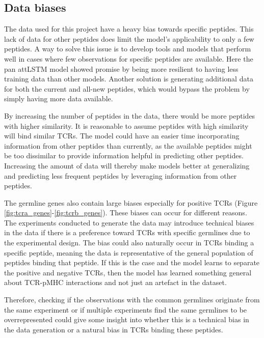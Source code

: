\subsection{Data biases}
The data used for this project have a heavy bias towards specific peptides. This lack of data for other peptides does limit the model's applicability to only a few peptides. A way to solve this issue is to develop tools and models that perform well in cases where few observations for specific peptides are available. Here the pan attLSTM model showed promise by being more resilient to having less training data than other models. Another solution is generating additional data for both the current and all-new peptides, which would bypass the problem by simply having more data available. 

By increasing the number of peptides in the data, there would be more peptides with higher similarity. It is reasonable to assume peptides with high similarity will bind similar TCRs. The model could have an easier time incorporating information from other peptides than currently, as the available peptides might be too dissimilar to provide information helpful in predicting other peptides. Increasing the amount of data will thereby make models better at generalizing and predicting less frequent peptides by leveraging information from other peptides.

The germline genes also contain large biases especially for positive TCRs (Figure \ref{fig:tcra_genes}-\ref{fig:tcrb_genes}). These biases can occur for different reasons. The experiments conducted to generate the data may introduce technical biases in the data if there is a preference toward TCRs with specific germlines due to the experimental design. The bias could also naturally occur in TCRs binding a specific peptide, meaning the data is representative of the general population of peptides binding that peptide. If this is the case and the model learns to separate the positive and negative TCRs, then the model has learned something general about TCR-pMHC interactions and not just an artefact in the dataset.

Therefore, checking if the observations with the common germlines originate from the same experiment or if multiple experiments find the same germlines to be overrepresented could give some insight into whether this is a technical bias in the data generation or a natural bias in TCRs binding these peptides.


